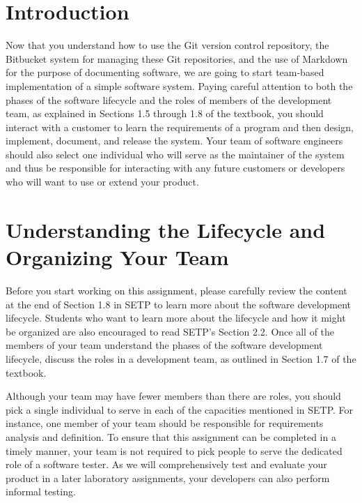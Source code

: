 

\usepackage[compact]{titlesec}



\vspace*{-.1in}
\section*{Introduction}

Now that you understand how to use the Git version control repository, the Bitbucket system for managing these Git
repositories, and the use of Markdown for the purpose of documenting software, we are going to start team-based
implementation of a simple software system. Paying careful attention to both the phases of the software lifecycle and
the roles of members of the development team, as explained in Sections 1.5 through 1.8 of the textbook, you should
interact with a customer to learn the requirements of a program and then design, implement, document, and release the
system. Your team of software engineers should also select one individual who will serve as the maintainer of the system
and thus be responsible for interacting with any future customers or developers who will want to use or extend your
product.

\section*{Understanding the Lifecycle and Organizing Your Team}

Before you start working on this assignment, please carefully review the content at the end of Section 1.8 in SETP to
learn more about the software development lifecycle. Students who want to learn more about the lifecycle and how it
might be organized are also encouraged to read SETP's Section 2.2. Once all of the members of your team understand the
phases of the software development lifecycle, discuss the roles in a development team, as outlined in Section 1.7 of the
textbook.

Although your team may have fewer members than there are roles, you should pick a single individual to serve in each of
the capacities mentioned in SETP. For instance, one member of your team should be responsible for requirements analysis
and definition. To ensure that this assignment can be completed in a timely manner, your team is not required to pick
people to serve the dedicated role of a software tester. As we will comprehensively test and evaluate your product in a
later laboratory assignments, your developers can also perform informal testing.

